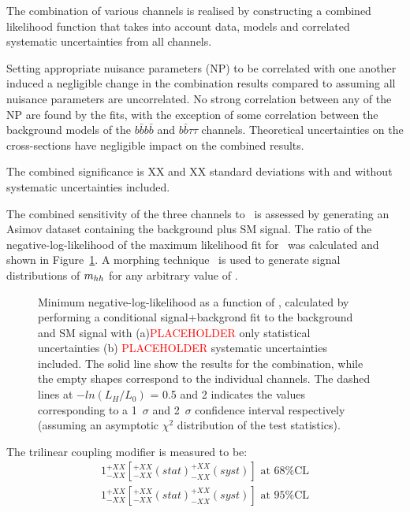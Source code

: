 The combination of various channels is realised by constructing a combined likelihood function that takes into account data, models and correlated systematic uncertainties from all channels. 

Setting appropriate nuisance parameters (NP) to be correlated with one another induced a negligible change in the combination results compared to assuming all nuisance parameters are uncorrelated. No strong correlation between any of the NP are found by the fits, with the exception of some correlation between the background models of the $b\bar{b}b\bar{b}$ and $b\bar{b}\tau\tau$ channels. Theoretical uncertainties on the cross-sections have negligible impact on the combined results.

The combined significance is XX and XX standard deviations with and without systematic uncertainties included.

The combined sensitivity of the three channels to \kl\ is assessed by generating an Asimov dataset containing the background plus SM signal. The ratio of the negative-log-likelihood of the maximum likelihood fit for \kl\ was calculated and shown in Figure~\ref{fig:ATLAS_HH_comb}. A morphing technique~\cite{ATL-PHYS-PUB-2015-047} is used to generate signal distributions of $m_{hh}$ for any arbitrary value of \kl.

\begin{figure}[!htb]
\centering 
{} 
\caption{Minimum negative-log-likelihood as a function of \kl, calculated by performing a conditional signal+backgrond fit to the background and SM signal with (a)\textcolor{red}{PLACEHOLDER} only statistical uncertainties (b) \textcolor{red}{PLACEHOLDER} systematic uncertainties included. The solid line show the results for the combination, while the empty shapes correspond to the individual channels. The dashed lines at $-ln(L_{H}/L_{0})$ = 0.5 and 2 indicates the values corresponding to a 1~$\sigma$ and 2~$\sigma$ confidence interval respectively (assuming an asymptotic $\chi^{2}$ distribution of the test statistics).} 
\label{fig:ATLAS_HH_comb} 
\end{figure}

The trilinear coupling modifier is measured to be:
\[
\begin{split}
1^{+XX}_{-XX} [^{+XX}_{-XX} (stat) ^{+XX}_{-XX} (syst)] \text{ at 68\% CL} \\
1^{+XX}_{-XX} [^{+XX}_{-XX} (stat) ^{+XX}_{-XX} (syst)] \text{ at 95\% CL}
\end{split}
\]

